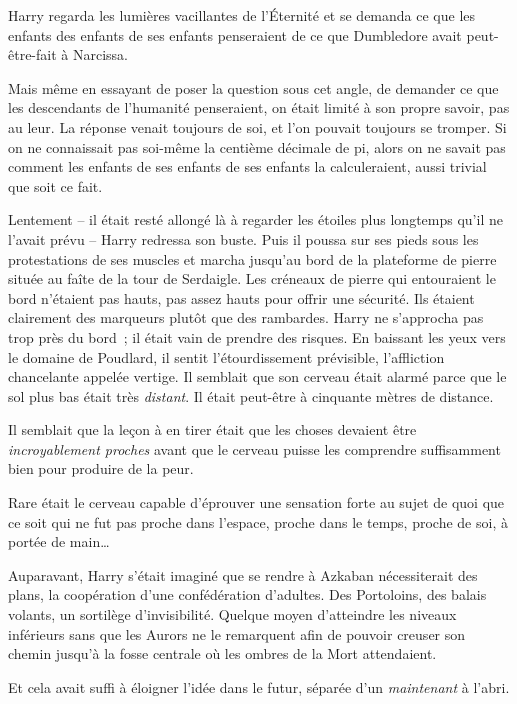 Harry regarda les lumières vacillantes de l'Éternité et se demanda ce que les enfants des enfants de ses enfants penseraient de ce que Dumbledore avait peut-être-fait à Narcissa.

Mais même en essayant de poser la question sous cet angle, de demander ce que les descendants de l'humanité penseraient, on était limité à son propre savoir, pas au leur.
La réponse venait toujours de soi, et l'on pouvait toujours se tromper.
Si on ne connaissait pas soi-même la centième décimale de pi, alors on ne savait pas comment les enfants de ses enfants de ses enfants la calculeraient, aussi trivial que soit ce fait.

\later

Lentement -- il était resté allongé là à regarder les étoiles plus longtemps qu'il ne l'avait prévu -- Harry redressa son buste.
Puis il poussa sur ses pieds sous les protestations de ses muscles et marcha jusqu'au bord de la plateforme de pierre située au faîte de la tour de Serdaigle.
Les créneaux de pierre qui entouraient le bord n'étaient pas hauts, pas assez hauts pour offrir une sécurité.
Ils étaient clairement des marqueurs plutôt que des rambardes.
Harry ne s'approcha pas trop près du bord~; il était vain de prendre des risques.
En baissant les yeux vers le domaine de Poudlard, il sentit l'étourdissement prévisible, l'affliction chancelante appelée vertige.
Il semblait que son cerveau était alarmé parce que le sol plus bas était très \emph{distant}.
Il était peut-être à cinquante mètres de distance.

Il semblait que la leçon à en tirer était que les choses devaient être \emph{incroyablement proches} avant que le cerveau puisse les comprendre suffisamment bien pour produire de la peur.

Rare était le cerveau capable d'éprouver une sensation forte au sujet de quoi que ce soit qui ne fut pas proche dans l'espace, proche dans le temps, proche de soi, à portée de main…

Auparavant, Harry s'était imaginé que se rendre à Azkaban nécessiterait des plans, la coopération d'une confédération d'adultes.
Des Portoloins, des balais volants, un sortilège d'invisibilité.
Quelque moyen d'atteindre les niveaux inférieurs sans que les Aurors ne le remarquent afin de pouvoir creuser son chemin jusqu'à la fosse centrale où les ombres de la Mort attendaient.

Et cela avait suffi à éloigner l'idée dans le futur, séparée d'un \emph{maintenant} à l'abri.

